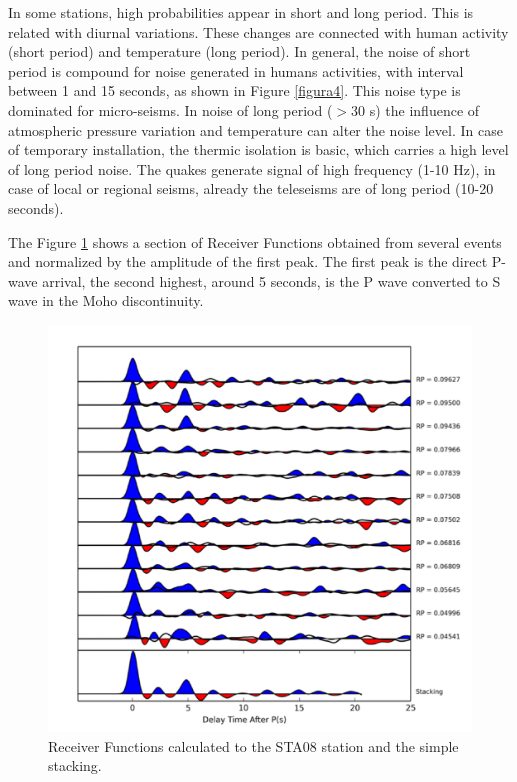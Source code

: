 \documentclass[twoside,letterpaper,twocolumn]{article}
\begin{document}
In some stations, high probabilities appear in short and long period. This is related with diurnal variations. These changes are connected with human activity (short period) and temperature (long period). In general, the noise of short period is compound for noise generated in humans activities, with interval between 1 and 15 seconds, as shown in Figure \ref{figura4}. This noise type is dominated for micro-seisms. In noise of long period ($>$30 s) the influence of atmospheric pressure variation and temperature can alter the noise level. In case of temporary installation, the thermic isolation is basic, which carries a high level of long period noise. The quakes generate signal of high frequency (1-10 Hz), in case of local or regional seisms, already the teleseisms are of long period (10-20 seconds).

The Figure \ref{figura5} shows a section of Receiver Functions obtained from several events and normalized by the amplitude of the first peak. The first peak is the direct P-wave arrival, the second highest, around 5 seconds, is the P wave converted to S wave in the Moho discontinuity. 

\begin{figure}[!ht]
\centering
\includegraphics[scale=0.35]{funcoes_do_receptor_calculadas.png}
\caption{Receiver Functions calculated to the STA08 station and the simple stacking.}
\label{figura5}
\end{figure}
\end{document}
